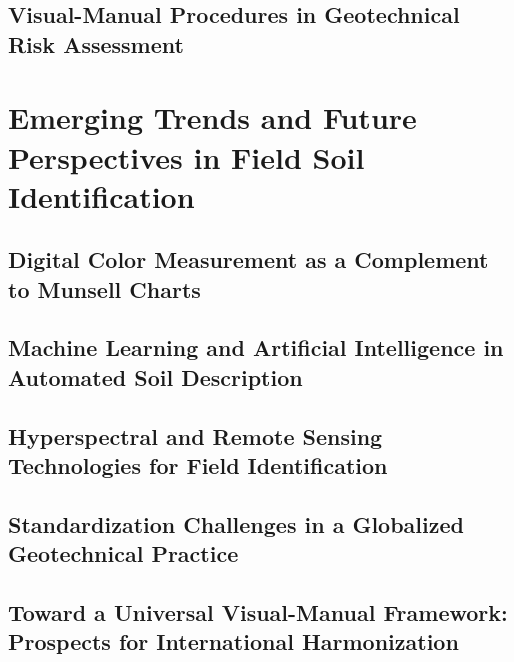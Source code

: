 \subsection{Visual-Manual Procedures in Geotechnical Risk Assessment}

\section{Emerging Trends and Future Perspectives in Field Soil Identification}

\subsection{Digital Color Measurement as a Complement to Munsell Charts}

\subsection{Machine Learning and Artificial Intelligence in Automated Soil Description}

\subsection{Hyperspectral and Remote Sensing Technologies for Field Identification}

\subsection{Standardization Challenges in a Globalized Geotechnical Practice}

\subsection{Toward a Universal Visual-Manual Framework: Prospects for International Harmonization}
